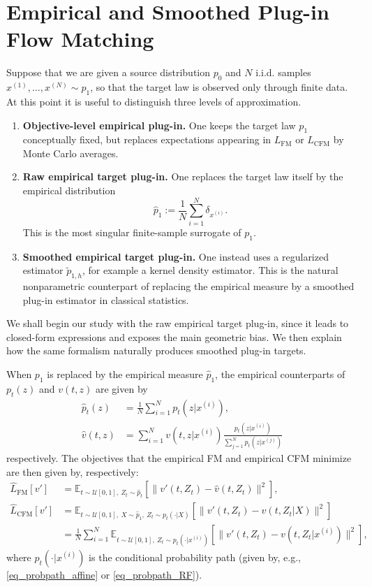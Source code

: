 \documentclass[a4paper,11pt]{article}
\theoremstyle{plain}
\theoremstyle{definition}
\begin{document}
\section{Empirical and Smoothed Plug-in Flow Matching}  \label{sec:empiricalfm}

Suppose that we are given a source distribution $p_0$ and $N$ i.i.d. samples $x^{(1)},\dots,x^{(N)} \sim p_1$, so that the target law is observed only through finite data. At this point it is useful to distinguish three levels of approximation.

\begin{enumerate}[label=(\roman*),leftmargin=2.5em]
    \item \textbf{Objective-level empirical plug-in.} One keeps the target law $p_1$ conceptually fixed, but replaces expectations appearing in $L_{\mathrm{FM}}$ or $L_{\mathrm{CFM}}$ by Monte Carlo averages.
    \item \textbf{Raw empirical target plug-in.} One replaces the target law itself by the empirical distribution
    \[
    \hat p_1 := \frac1N \sum_{i=1}^N \delta_{x^{(i)}}.
    \]
    This is the most singular finite-sample surrogate of $p_1$.
    \item \textbf{Smoothed empirical target plug-in.} One instead uses a regularized estimator $\tilde p_{1,h}$, for example a kernel density estimator. This is the natural nonparametric counterpart of replacing the empirical measure by a smoothed plug-in estimator in classical statistics.
\end{enumerate}

We shall begin our study with the raw empirical target plug-in, since it leads to closed-form expressions and exposes the main geometric bias. We then explain how the same formalism naturally produces smoothed plug-in targets.

When $p_1$ is replaced by the empirical measure $\hat p_1$, the empirical counterparts of $p_t(z)$ and $v(t,z)$ are given by
\begin{align}
    \hat{p}_t(z) &= \frac{1}{N} \sum_{i=1}^N p_t(z|x^{(i)}), \\
    \hat{v}(t,z) &= \sum_{i=1}^N v(t,z| x^{(i)}) \frac{p_t(z|x^{(i)})}{\sum_{j=1}^N p_t(z|x^{(j)})}   
\end{align}
respectively. The objectives that the empirical FM and empirical CFM minimize are then given by, respectively:
\begin{align}
    \hat{L}_{\text{FM}}[v'] &= \mathbb{E}_{t \sim \mathcal{U}[0,1],  \ Z_t \sim \hat{p}_t}[\|v'(t, Z_t) - \hat{v}(t, Z_t)\|^2], \\ 
    \hat{L}_{\text{CFM}}[v'] &= \mathbb{E}_{t \sim \mathcal{U}[0,1], \ X \sim \hat{p}_1, \ Z_t \sim p_t(\cdot | X)}[\|v'(t, Z_t) - v(t, Z_t| X)\|^2] \nonumber \\
    &= \frac{1}{N} \sum_{i=1}^N \mathbb{E}_{t \sim \mathcal{U}[0,1], \ Z_t \sim p_t(\cdot | x^{(i)})}[\|v'(t, Z_t) - v(t, Z_t| x^{(i)})\|^2],
\end{align}
where $p_t(\cdot|x^{(i)})$ is the conditional probability path (given by, e.g., \eqref{eq_probpath_affine} or \eqref{eq_probpath_RF}).
\end{document}
